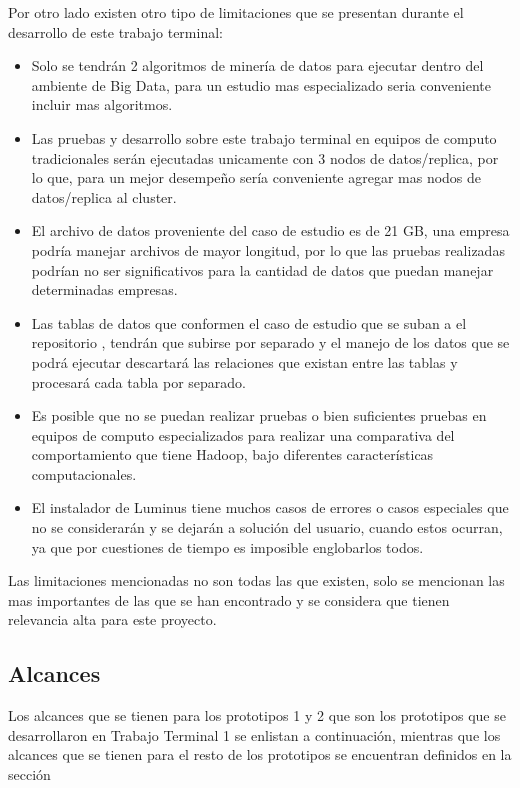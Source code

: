 Por otro lado existen otro tipo de limitaciones que se presentan durante el desarrollo de este trabajo terminal:
\begin{itemize}
	\item Solo se tendrán 2 algoritmos de minería de datos para ejecutar dentro del ambiente de Big Data, para un estudio mas especializado seria conveniente incluir mas algoritmos.
	\item Las pruebas y desarrollo sobre este trabajo terminal en equipos de computo tradicionales serán ejecutadas unicamente con 3 nodos de datos/replica, por lo que, para un mejor desempeño sería conveniente agregar mas nodos de datos/replica al cluster.
	\item El archivo de datos proveniente del caso de estudio es de 21 GB, una empresa podría manejar archivos de mayor longitud, por lo que las pruebas realizadas podrían no ser significativos para la cantidad de datos que puedan manejar determinadas empresas. 
	\item Las tablas de datos que conformen el caso de estudio que se suban a el repositorio , tendrán que subirse por separado y el manejo de los datos que se podrá ejecutar descartará las relaciones que existan entre las tablas y procesará cada tabla por separado.
	\item Es posible que no se puedan realizar pruebas o bien suficientes pruebas en equipos de computo especializados para realizar una comparativa del comportamiento que tiene Hadoop, bajo diferentes características computacionales.
	\item El instalador de Luminus tiene muchos casos de errores o casos especiales que no se considerarán y se dejarán a solución del usuario, cuando estos ocurran, ya que por cuestiones de tiempo es imposible englobarlos todos.
\end{itemize}
Las limitaciones mencionadas no son todas las que existen, solo se mencionan las mas importantes de las que se han encontrado y se considera que tienen relevancia alta para este proyecto.

\subsection{Alcances}

Los alcances que se tienen para los prototipos 1 y 2 que son los prototipos que se desarrollaron en Trabajo Terminal 1 se enlistan a continuación, mientras que los alcances que se tienen para el resto de los prototipos se encuentran definidos en la sección 
\\
